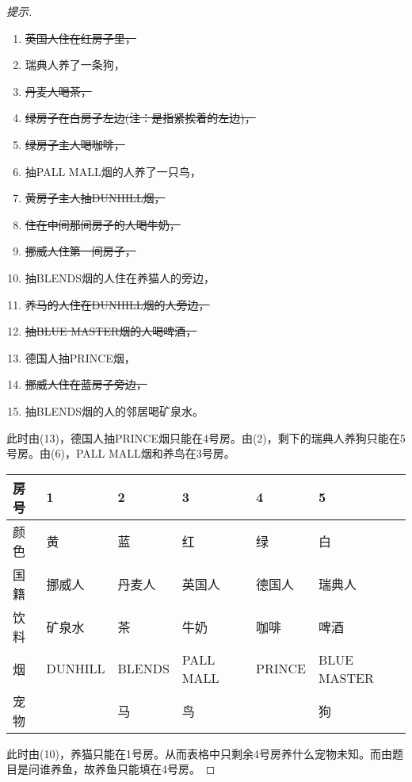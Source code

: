 \begin{proof}[提示]
    \begin{enumerate}
    \item \sout{英国人住在红房子里，}
    \item 瑞典人养了一条狗，
    \item \sout{丹麦人喝茶，}
    \item \sout{绿房子在白房子左边(注：是指紧挨着的左边)，}
    \item \sout{绿房子主人喝咖啡，}
    \item 抽PALL MALL烟的人养了一只鸟，
    \item \sout{黄房子主人抽DUNHILL烟，}
    \item \sout{住在中间那间房子的人喝牛奶，}
    \item \sout{挪威人住第一间房子，}
    \item 抽BLENDS烟的人住在养猫人的旁边，
    \item \sout{养马的人住在DUNHILL烟的人旁边，}
    \item \sout{抽BLUE MASTER烟的人喝啤酒，}
    \item 德国人抽PRINCE烟，
    \item \sout{挪威人住在蓝房子旁边，}
    \item 抽BLENDS烟的人的邻居喝矿泉水。
    \end{enumerate}

    此时由(13)，德国人抽PRINCE烟只能在4号房。由(2)，剩下的瑞典人养狗只能在5号房。由(6)，PALL MALL烟和养鸟在3号房。
    \begin{center}
      \renewcommand*{\arraystretch}{1.0}
      \begin{tabular}{l|l|l|l|l|l}
        \hline
        房号     & 1      & 2      & 3         & 4     & 5           \\\hline
        颜色     & 黄     & 蓝     & 红        & 绿    &白           \\\hline
        国籍     & 挪威人 & 丹麦人 & 英国人    & 德国人&瑞典人       \\\hline
        饮料     & 矿泉水 & 茶     & 牛奶      & 咖啡  &啤酒         \\\hline
        烟       & DUNHILL& BLENDS & PALL MALL & PRINCE&BLUE MASTER  \\\hline
        宠物     &        & 马     & 鸟        &       &狗           \\
        \hline
      \end{tabular}
    \end{center}

    此时由(10)，养猫只能在1号房。从而表格中只剩余4号房养什么宠物未知。而由题目是问谁养鱼，故养鱼只能填在4号房。
\end{proof}


